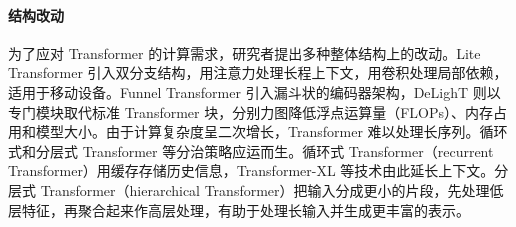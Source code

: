 

\paragraph{结构改动}
为了应对 Transformer 的计算需求，研究者提出多种整体结构上的改动。Lite Transformer 引入双分支结构，用注意力处理长程上下文，用卷积处理局部依赖，适用于移动设备。Funnel Transformer 引入漏斗状的编码器架构，DeLighT 则以专门模块取代标准 Transformer 块，分别力图降低浮点运算量（FLOPs）、内存占用和模型大小。由于计算复杂度呈二次增长，Transformer 难以处理长序列。循环式和分层式 Transformer 等分治策略应运而生。循环式 Transformer（recurrent Transformer）用缓存存储历史信息，Transformer-XL 等技术由此延长上下文。分层式 Transformer（hierarchical Transformer）把输入分成更小的片段，先处理低层特征，再聚合起来作高层处理，有助于处理长输入并生成更丰富的表示。
